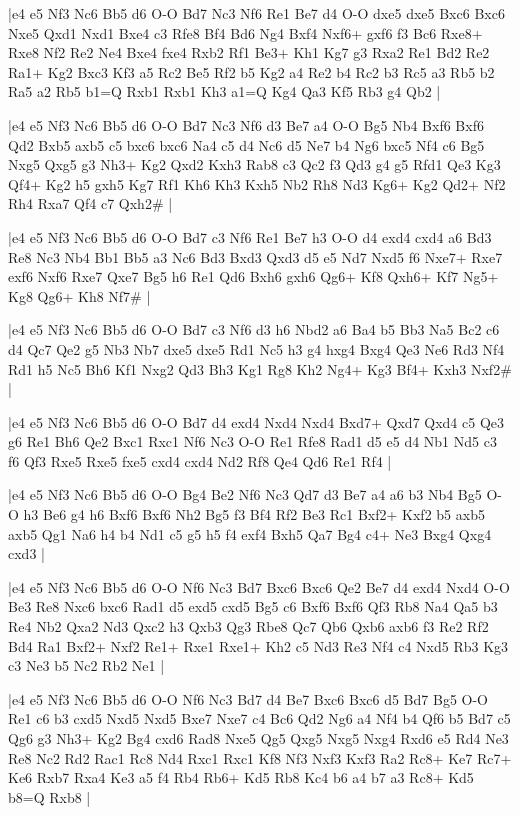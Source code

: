 \whitename{}
\blackname{}
\makegametitle
|e4 e5 Nf3 Nc6 Bb5 d6 O-O Bd7 Nc3 Nf6 Re1 Be7 d4 O-O dxe5 dxe5 Bxc6 Bxc6 Nxe5 Qxd1 Nxd1 Bxe4 c3 Rfe8 Bf4 Bd6 Ng4 Bxf4 Nxf6+ gxf6 f3 Bc6 Rxe8+ Rxe8 Nf2 Re2 Ne4 Bxe4 fxe4 Rxb2 Rf1 Be3+ Kh1 Kg7 g3 Rxa2 Re1 Bd2 Re2 Ra1+ Kg2 Bxc3 Kf3 a5 Rc2 Be5 Rf2 b5 Kg2 a4 Re2 b4 Rc2 b3 Rc5 a3 Rb5 b2 Ra5 a2 Rb5 b1=Q Rxb1 Rxb1 Kh3 a1=Q Kg4 Qa3 Kf5 Rb3 g4 Qb2  |

\whitename{}
\blackname{}
\makegametitle
|e4 e5 Nf3 Nc6 Bb5 d6 O-O Bd7 Nc3 Nf6 d3 Be7 a4 O-O Bg5 Nb4 Bxf6 Bxf6 Qd2 Bxb5 axb5 c5 bxc6 bxc6 Na4 c5 d4 Nc6 d5 Ne7 b4 Ng6 bxc5 Nf4 c6 Bg5 Nxg5 Qxg5 g3 Nh3+ Kg2 Qxd2 Kxh3 Rab8 c3 Qc2 f3 Qd3 g4 g5 Rfd1 Qe3 Kg3 Qf4+ Kg2 h5 gxh5 Kg7 Rf1 Kh6 Kh3 Kxh5 Nb2 Rh8 Nd3 Kg6+ Kg2 Qd2+ Nf2 Rh4 Rxa7 Qf4 c7 Qxh2\#  |

\whitename{}
\blackname{}
\makegametitle
|e4 e5 Nf3 Nc6 Bb5 d6 O-O Bd7 c3 Nf6 Re1 Be7 h3 O-O d4 exd4 cxd4 a6 Bd3 Re8 Nc3 Nb4 Bb1 Bb5 a3 Nc6 Bd3 Bxd3 Qxd3 d5 e5 Nd7 Nxd5 f6 Nxe7+ Rxe7 exf6 Nxf6 Rxe7 Qxe7 Bg5 h6 Re1 Qd6 Bxh6 gxh6 Qg6+ Kf8 Qxh6+ Kf7 Ng5+ Kg8 Qg6+ Kh8 Nf7\#  |

\whitename{}
\blackname{}
\makegametitle
|e4 e5 Nf3 Nc6 Bb5 d6 O-O Bd7 c3 Nf6 d3 h6 Nbd2 a6 Ba4 b5 Bb3 Na5 Bc2 c6 d4 Qc7 Qe2 g5 Nb3 Nb7 dxe5 dxe5 Rd1 Nc5 h3 g4 hxg4 Bxg4 Qe3 Ne6 Rd3 Nf4 Rd1 h5 Nc5 Bh6 Kf1 Nxg2 Qd3 Bh3 Kg1 Rg8 Kh2 Ng4+ Kg3 Bf4+ Kxh3 Nxf2\#  |

\whitename{}
\blackname{}
\makegametitle
|e4 e5 Nf3 Nc6 Bb5 d6 O-O Bd7 d4 exd4 Nxd4 Nxd4 Bxd7+ Qxd7 Qxd4 c5 Qe3 g6 Re1 Bh6 Qe2 Bxc1 Rxc1 Nf6 Nc3 O-O Re1 Rfe8 Rad1 d5 e5 d4 Nb1 Nd5 c3 f6 Qf3 Rxe5 Rxe5 fxe5 cxd4 cxd4 Nd2 Rf8 Qe4 Qd6 Re1 Rf4  |

\whitename{}
\blackname{}
\makegametitle
|e4 e5 Nf3 Nc6 Bb5 d6 O-O Bg4 Be2 Nf6 Nc3 Qd7 d3 Be7 a4 a6 b3 Nb4 Bg5 O-O h3 Be6 g4 h6 Bxf6 Bxf6 Nh2 Bg5 f3 Bf4 Rf2 Be3 Rc1 Bxf2+ Kxf2 b5 axb5 axb5 Qg1 Na6 h4 b4 Nd1 c5 g5 h5 f4 exf4 Bxh5 Qa7 Bg4 c4+ Ne3 Bxg4 Qxg4 cxd3  |

\whitename{}
\blackname{}
\makegametitle
|e4 e5 Nf3 Nc6 Bb5 d6 O-O Nf6 Nc3 Bd7 Bxc6 Bxc6 Qe2 Be7 d4 exd4 Nxd4 O-O Be3 Re8 Nxc6 bxc6 Rad1 d5 exd5 cxd5 Bg5 c6 Bxf6 Bxf6 Qf3 Rb8 Na4 Qa5 b3 Re4 Nb2 Qxa2 Nd3 Qxc2 h3 Qxb3 Qg3 Rbe8 Qc7 Qb6 Qxb6 axb6 f3 Re2 Rf2 Bd4 Ra1 Bxf2+ Nxf2 Re1+ Rxe1 Rxe1+ Kh2 c5 Nd3 Re3 Nf4 c4 Nxd5 Rb3 Kg3 c3 Ne3 b5 Nc2 Rb2 Ne1  |

\whitename{}
\blackname{}
\makegametitle
|e4 e5 Nf3 Nc6 Bb5 d6 O-O Nf6 Nc3 Bd7 d4 Be7 Bxc6 Bxc6 d5 Bd7 Bg5 O-O Re1 c6 b3 cxd5 Nxd5 Nxd5 Bxe7 Nxe7 c4 Bc6 Qd2 Ng6 a4 Nf4 b4 Qf6 b5 Bd7 c5 Qg6 g3 Nh3+ Kg2 Bg4 cxd6 Rad8 Nxe5 Qg5 Qxg5 Nxg5 Nxg4 Rxd6 e5 Rd4 Ne3 Re8 Nc2 Rd2 Rac1 Rc8 Nd4 Rxc1 Rxc1 Kf8 Nf3 Nxf3 Kxf3 Ra2 Rc8+ Ke7 Rc7+ Ke6 Rxb7 Rxa4 Ke3 a5 f4 Rb4 Rb6+ Kd5 Rb8 Kc4 b6 a4 b7 a3 Rc8+ Kd5 b8=Q Rxb8  |

